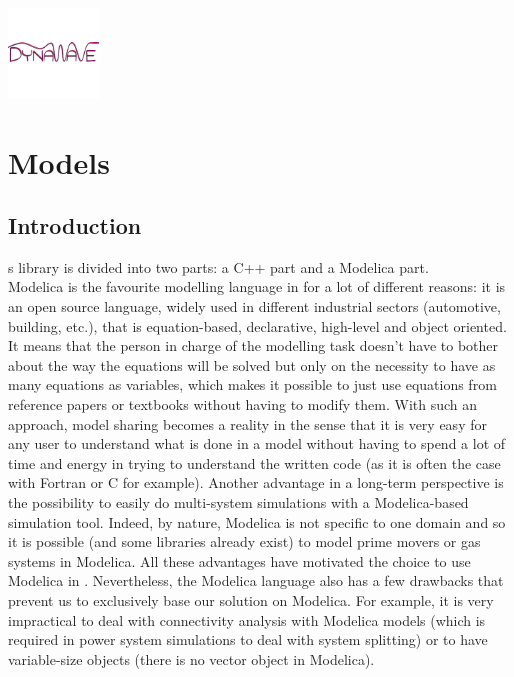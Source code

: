 \documentclass[a4paper, 12pt]{report}
\begin{document}
\begin{center}
\includegraphics[width=0.18\textwidth]{../resources/DynaWave.png}
\end{center}

\newpage
\section{Models}

\subsection{Introduction}

\Dynawo\textquotesingle s library is divided into two parts: a C++ part and a Modelica part. \\

Modelica is the favourite modelling language in \Dynawo for a lot of different reasons: it is an open source language, widely used in different industrial sectors (automotive, building, etc.), that is equation-based, declarative, high-level and object oriented. It means that the person in charge of the modelling task doesn't have to bother about the way the equations will be solved but only on the necessity to have as many equations as variables, which makes it possible to just use equations from reference papers or textbooks without having to modify them. With such an approach, model sharing becomes a reality in the sense that it is very easy for any user to understand what is done in a model without having to spend a lot of time and energy in trying to understand the written code (as it is often the case with Fortran or C for example). Another advantage in a long-term perspective is the possibility to easily do multi-system simulations with a Modelica-based simulation tool. Indeed, by nature, Modelica is not specific to one domain and so it is possible (and some libraries already exist) to model prime movers or gas systems in Modelica. All these advantages have motivated the choice to use Modelica in \Dynawo. Nevertheless, the Modelica language also has a few drawbacks that prevent us to exclusively base our solution on Modelica. For example, it is very impractical to deal with connectivity analysis with Modelica models (which is required in power system simulations to deal with system splitting) or to have variable-size objects (there is no vector object in Modelica). \\
\end{document}
